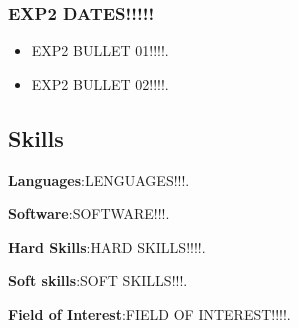 \documentclass[a4paper, 9pt]{article}
\begin{document}
\subsubsection*{EXP2 DATES!!!!!}
\begin{itemize}[noitemsep]
\item EXP2 BULLET 01!!!!.
\item EXP2 BULLET 02!!!!.
\end{itemize}

\subsection*{}
\subsection*{Skills}

\textbf {Languages}:\small LENGUAGES!!!.

\noindent \textbf{Software}:\small SOFTWARE!!!.

\noindent \textbf{Hard Skills}:\small HARD SKILLS!!!!.

\noindent \textbf{Soft skills}:\small SOFT SKILLS!!!.

\noindent \textbf{Field of Interest}:\small FIELD OF INTEREST!!!!.
\end{document}
